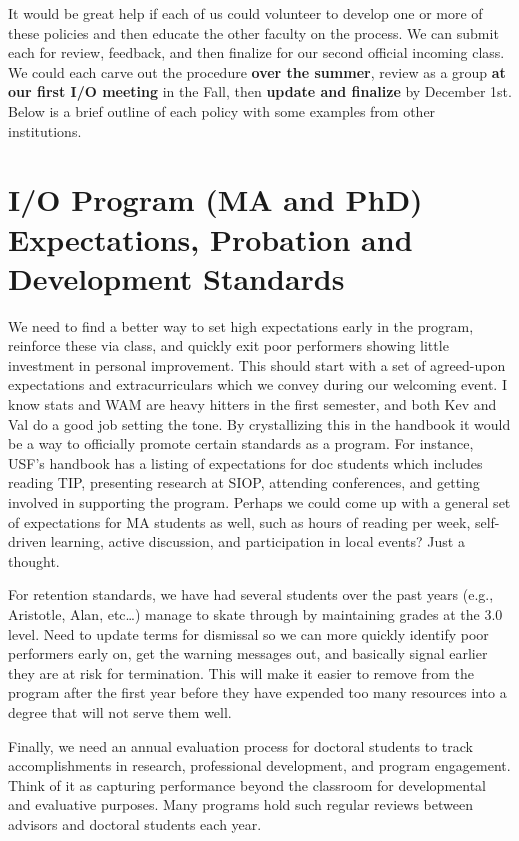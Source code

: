 \documentclass[
]{book}
\begin{document}
It would be great help if each of us could volunteer to develop one or more of these policies and then educate the other faculty on the process. We can submit each for review, feedback, and then finalize for our second official incoming class. We could each carve out the procedure \textbf{over the summer}, review as a group \textbf{at our first I/O meeting} in the Fall, then \textbf{update and finalize} by December 1st. Below is a brief outline of each policy with some examples from other institutions.

\hypertarget{develop}{%
\chapter{I/O Program (MA and PhD) Expectations, Probation and Development Standards}\label{develop}}

We need to find a better way to set high expectations early in the program, reinforce these via class, and quickly exit poor performers showing little investment in personal improvement. This should start with a set of agreed-upon expectations and extracurriculars which we convey during our welcoming event. I know stats and WAM are heavy hitters in the first semester, and both Kev and Val do a good job setting the tone. By crystallizing this in the handbook it would be a way to officially promote certain standards as a program. For instance, USF's handbook has a listing of expectations for doc students which includes reading TIP, presenting research at SIOP, attending conferences, and getting involved in supporting the program. Perhaps we could come up with a general set of expectations for MA students as well, such as hours of reading per week, self-driven learning, active discussion, and participation in local events? Just a thought.

For retention standards, we have had several students over the past years (e.g., Aristotle, Alan, etc\ldots) manage to skate through by maintaining grades at the 3.0 level. Need to update terms for dismissal so we can more quickly identify poor performers early on, get the warning messages out, and basically signal earlier they are at risk for termination. This will make it easier to remove from the program after the first year before they have expended too many resources into a degree that will not serve them well.

Finally, we need an annual evaluation process for doctoral students to track accomplishments in research, professional development, and program engagement. Think of it as capturing performance beyond the classroom for developmental and evaluative purposes. Many programs hold such regular reviews between advisors and doctoral students each year.
\end{document}

